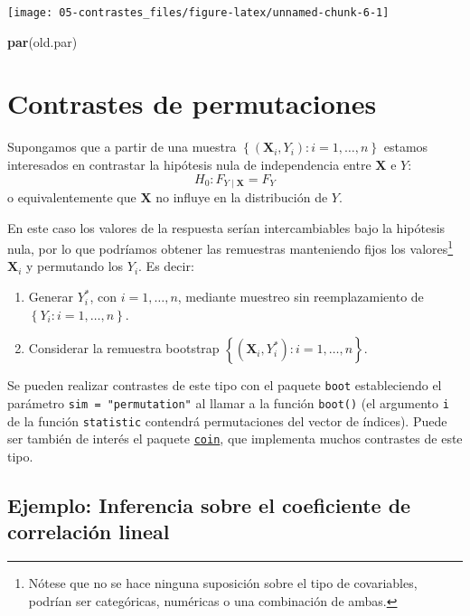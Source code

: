 \documentclass[]{book}
\newenvironment{Shaded}{\begin{snugshade}}{\end{snugshade}}
\newcommand{\KeywordTok}[1]{\textcolor[rgb]{0.13,0.29,0.53}{\textbf{#1}}}
\newcommand{\NormalTok}[1]{#1}
\theoremstyle{break}
\theoremstyle{definition}
\theoremstyle{definition}
\theoremstyle{definition}
\theoremstyle{remark}
\begin{document}
\begin{center}\texttt{[image: 05-contrastes\_files/figure-latex/unnamed-chunk-6-1]} \end{center}

\begin{Shaded}
\begin{Highlighting}[]
\KeywordTok{par}\NormalTok{(old.par)}
\end{Highlighting}
\end{Shaded}

\section{Contrastes de permutaciones}\label{contrastes-de-permutaciones}

Supongamos que a partir de una muestra
\(\left\{ \left( \mathbf{X}_i, Y_i\right): i=1,\ldots, n \right\}\)
estamos interesados en contrastar la hipótesis nula de independencia
entre \(\mathbf{X}\) e \(Y\): \[H_0: F_{Y \mid \mathbf{X}} = F_Y\] o
equivalentemente que \(\mathbf{X}\) no influye en la distribución de
\(Y\).

En este caso los valores de la respuesta serían intercambiables bajo la
hipótesis nula, por lo que podríamos obtener las remuestras manteniendo
fijos los valores\footnote{Nótese que no se hace ninguna suposición
  sobre el tipo de covariables, podrían ser categóricas, numéricas o una
  combinación de ambas.} \(\mathbf{X}_i\) y permutando los \(Y_i\). Es
decir:

\begin{enumerate}
\def\labelenumi{\arabic{enumi}.}
\item
  Generar \(Y^{\ast}_i\), con \(i=1,\ldots, n\), mediante muestreo sin
  reemplazamiento de \(\left\{ Y_i: i=1,\ldots, n \right\}\).
\item
  Considerar la remuestra bootstrap
  \(\left\{ \left( \mathbf{X}_i, Y^{\ast}_i\right): i=1,\ldots, n \right\}\).
\end{enumerate}

Se pueden realizar contrastes de este tipo con el paquete \texttt{boot}
estableciendo el parámetro \texttt{sim\ =\ "permutation"} al llamar a la
función \texttt{boot()} (el argumento \texttt{i} de la función
\texttt{statistic} contendrá permutaciones del vector de índices). Puede
ser también de interés el paquete
\href{https://cran.r-project.org/web/packages/coin/index.html}{\texttt{coin}},
que implementa muchos contrastes de este tipo.

\subsection{Ejemplo: Inferencia sobre el coeficiente de correlación
lineal}\label{ejemplo-inferencia-sobre-el-coeficiente-de-correlaciuxf3n-lineal}
\end{document}

